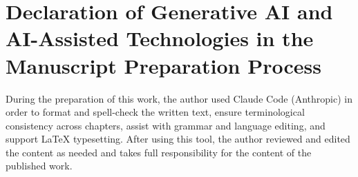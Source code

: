 \chapter{Declaration of Generative AI and AI-Assisted Technologies in the Manuscript Preparation Process}

During the preparation of this work, the author used Claude Code (Anthropic) in order to format and spell-check the written text, ensure terminological consistency across chapters, assist with grammar and language editing, and support \LaTeX{} typesetting. After using this tool, the author reviewed and edited the content as needed and takes full responsibility for the content of the published work.
